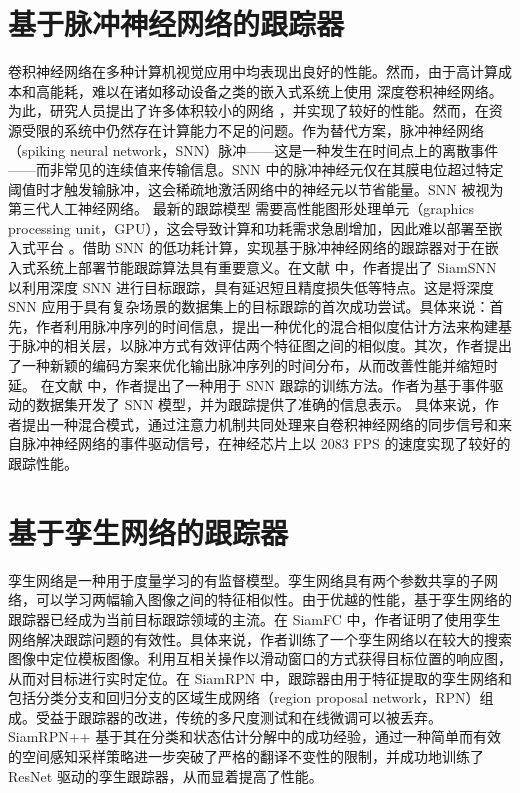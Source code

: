 \section{基于脉冲神经网络的跟踪器}%
卷积神经网络在多种计算机视觉应用中均表现出良好的性能。然而，由于高计算成本和高能耗，难以在诸如移动设备之类的嵌入式系统上使用 深度卷积神经网络。为此，研究人员提出了许多体积较小的网络 \cite{wei2018quantization}，并实现了较好的性能。然而，在资源受限的系统中仍然存在计算能力不足的问题。作为替代方案，脉冲神经网络（spiking neural network，SNN）脉冲——这是一种发生在时间点上的离散事件——而非常见的连续值来传输信息。SNN 中的脉冲神经元仅在其膜电位超过特定阈值时才触发输脉冲，这会稀疏地激活网络中的神经元以节省能量。SNN 被视为第三代人工神经网络。
最新的跟踪模型 \cite{SiamFC,SiamRPN} 需要高性能图形处理单元（graphics processing unit，GPU），这会导致计算和功耗需求急剧增加，因此难以部署至嵌入式平台 \cite{basu2018low}。借助 SNN 的低功耗计算，实现基于脉冲神经网络的跟踪器对于在嵌入式系统上部署节能跟踪算法具有重要意义。在文献 \cite{SiamSNN} 中，作者提出了 SiamSNN 以利用深度 SNN 进行目标跟踪，具有延迟短且精度损失低等特点。这是将深度 SNN 应用于具有复杂场景的数据集上的目标跟踪的首次成功尝试。具体来说：首先，作者利用脉冲序列的时间信息，提出一种优化的混合相似度估计方法来构建基于脉冲的相关层，以脉冲方式有效评估两个特征图之间的相似度。其次，作者提出了一种新颖的编码方案来优化输出脉冲序列的时间分布，从而改善性能并缩短时延。
在文献 \cite{DashNet} 中，作者提出了一种用于 SNN 跟踪的训练方法。作者为基于事件驱动的数据集开发了 SNN 模型，并为跟踪提供了准确的信息表示。
具体来说，作者提出一种混合模式，通过注意力机制共同处理来自卷积神经网络的同步信号和来自脉冲神经网络的事件驱动信号，在神经芯片上以 2083 FPS 的速度实现了较好的跟踪性能。%
\section{基于孪生网络的跟踪器}
孪生网络是一种用于度量学习的有监督模型。孪生网络具有两个参数共享的子网络，可以学习两幅输入图像之间的特征相似性。由于优越的性能，基于孪生网络的跟踪器已经成为当前目标跟踪领域的主流。在 SiamFC \cite{SiamFC} 中，作者证明了使用孪生网络解决跟踪问题的有效性。具体来说，作者训练了一个孪生网络以在较大的搜索图像中定位模板图像。利用互相关操作以滑动窗口的方式获得目标位置的响应图，从而对目标进行实时定位。在 SiamRPN \cite{SiamRPN} 中，跟踪器由用于特征提取的孪生网络和包括分类分支和回归分支的区域生成网络（region proposal network，RPN）组成。受益于跟踪器的改进，传统的多尺度测试和在线微调可以被丢弃。SiamRPN++ \cite{SiamRPN++} 基于其在分类和状态估计分解中的成功经验，通过一种简单而有效的空间感知采样策略进一步突破了严格的翻译不变性的限制，并成功地训练了 ResNet \cite{ResNet} 驱动的孪生跟踪器，从而显着提高了性能。
